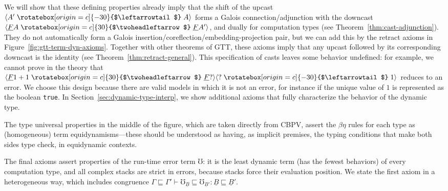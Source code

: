 \documentclass[acmsmall,nonacm]{acmart}
\renewcommand{\u}{\underline}
\newcommand{\ltdyn}{\sqsubseteq}
\newcommand{\dynv}{{?}}
\newcommand{\uarrow}{\mathrel{\rotatebox[origin=c]{-30}{$\leftarrowtail$}}}
\newcommand{\darrow}{\mathrel{\rotatebox[origin=c]{30}{$\twoheadleftarrow$}}}
\newcommand{\upcast}[2]{\langle{#2}\uarrow{#1}\rangle}
\newcommand{\dncast}[2]{\langle{#1}\darrow{#2}\rangle}
\newcommand{\err}{\mho}
\begin{document}
We will show that these defining properties already imply that the shift
of the upcast $\upcast{A}{A'}$ forms a Galois connection/adjunction with
the downcast $\dncast{\u F A}{\u F A'}$, and dually for computation
types (see Theorem~\ref{thm:cast-adjunction}).  They do not
automatically form a Galois insertion/coreflection/embedding-projection
pair, but we can add this by the retract axioms in
Figure~\ref{fig:gtt-term-dyn-axioms}.  Together with other theorems of
GTT, these axioms imply that any upcast followed by its corresponding
downcast is the identity (see Theorem~\ref{thm:retract-general}).  This
specification of casts leaves some behavior undefined: for example, we
cannot prove in the theory that $\dncast{\u F 1+1}{\u
  F\dynv}\upcast{1}{\dynv}$ reduces to an error.  We choose this design
because there are valid models in which it is not an error, for instance
if the unique value of $1$ is represented as the boolean \texttt{true}. In
Section~\ref{sec:dynamic-type-interp}, we show additional axioms that
fully characterize the behavior of the dynamic type.

The type universal properties in the middle of the figure, which are
taken directly from CBPV, assert the $\beta\eta$ rules for each type as
(homogeneous) term equidynamisms---these should be understood as having,
as implicit premises, the typing conditions that make both sides type
check, in equidynamic contexts.

The final axioms assert properties of the run-time error term $\err$: it
is the least dynamic term (has the fewest behaviors) of every
computation type, and all complex stacks are strict in errors, because
stacks force their evaluation position.  We state the first axiom in a
heterogeneous way, which includes congruence $\Gamma \ltdyn \Gamma'
\vdash \err_{\u B} \ltdyn \err_{\u B'} : \u B \ltdyn \u B'$.
\end{document}
